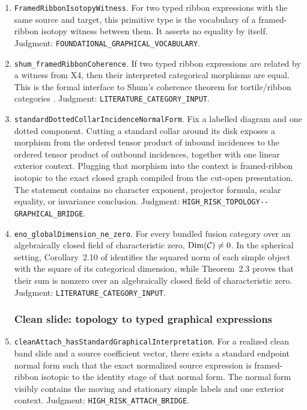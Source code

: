\begin{enumerate}[label=\textbf{X\arabic*.},leftmargin=*]
\item \texttt{FramedRibbonIsotopyWitness}.
For two typed ribbon expressions with the same source and target, this
primitive type is the vocabulary of a framed-ribbon isotopy witness between
them.  It asserts no equality by itself.  Judgment:
\nolinkurl{FOUNDATIONAL_GRAPHICAL_VOCABULARY}.

\item \nolinkurl{shum_framedRibbonCoherence}.
If two typed ribbon expressions are related by a witness from X4, then their
interpreted categorical morphisms are equal.  This is the formal interface to
Shum's coherence theorem for tortile/ribbon categories
\cite[Theorem~2.6]{Shum1994}.  Judgment:
\nolinkurl{LITERATURE_CATEGORY_INPUT}.

\item \nolinkurl{standardDottedCollarIncidenceNormalForm}.
Fix a labelled diagram and one dotted component.  Cutting a standard collar
around its disk exposes a morphism from the ordered tensor product of inbound
incidences to the ordered tensor product of outbound incidences, together with
one linear exterior context.  Plugging that morphism into the context is
framed-ribbon isotopic to the exact closed graph compiled from the cut-open
presentation.  The statement contains no character exponent, projector
formula, scalar equality, or invariance conclusion.  Judgment:
\nolinkurl{HIGH_RISK_TOPOLOGY--GRAPHICAL_BRIDGE}.

\item \nolinkurl{eno_globalDimension_ne_zero}.
For every bundled fusion category over an algebraically closed field of
characteristic zero,
$\operatorname{Dim}(\mathcal{C})\ne0$.  In the spherical setting, Corollary~2.10 of
\cite{ENO2005} identifies the squared norm of each simple object with the
square of its categorical dimension, while Theorem~2.3 proves that their sum
is nonzero over an algebraically closed field of characteristic zero.
Judgment: \nolinkurl{LITERATURE_CATEGORY_INPUT}.

\subsubsection*{Clean slide: topology to typed graphical expressions}

\item \nolinkurl{cleanAttach_hasStandardGraphicalInterpretation}.
For a realized clean band slide and a source coefficient vector, there exists
a standard endpoint normal form such that the exact normalized source
expression is framed-ribbon isotopic to the identity stage of that normal
form.  The normal form visibly contains the moving and stationary simple
labels and one exterior context.  Judgment:
\nolinkurl{HIGH_RISK_ATTACH_BRIDGE}.


\end{enumerate}
